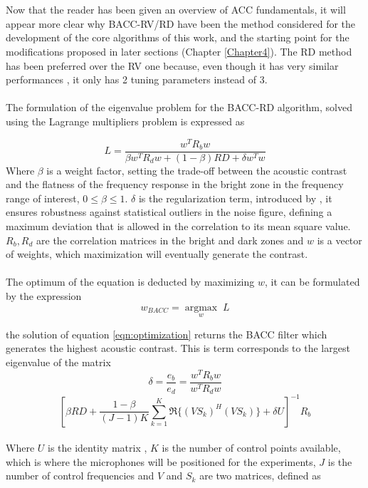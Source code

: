 \\
\\
Now that the reader has been given an overview of ACC fundamentals, it will appear more clear why BACC-RV/RD have been the method considered for the development of the core algorithms of this work, and the starting point for the modifications proposed in later sections (Chapter \ref{Chapter4}). The RD method has been preferred over the RV one because, even though it has very similar performances \parencite{cai_time-domain_2014,schellekens_time_2016}, it only has 2 tuning parameters instead of 3.
\\
\\
The formulation of the eigenvalue problem for the BACC-RD algorithm, solved using the Lagrange multipliers problem is expressed as

\begin{equation}
L = \frac{w^T R_b w}{\beta w^T R_d w + (1 - \beta) RD + \delta w^T w}
\label{eqn:lagrange}
\end{equation}
Where $\beta$ is a weight factor, setting the trade-off between the acoustic contrast and the flatness of the frequency response in the bright zone in the frequency range of interest, $0\le \beta \le 1$. $\delta$ is the regularization term, introduced by \parencite{elliott_robustness_2012}, it ensures robustness against statistical outliers in the noise figure, defining a maximum deviation that is allowed in the correlation to its mean square value. $R_b, R_d$ are the correlation matrices in the bright and dark zones and $w$ is a vector of weights, which maximization will eventually generate the contrast.
\\
\\
The optimum of the equation is deducted by maximizing $w$, it can be formulated by the expression
\\
\begin{equation}
w_{BACC} = \underset{w}{\operatorname{argmax}} \; L
\label{eqn:optimization}
\end{equation}

the solution of equation \ref{eqn:optimization} returns the BACC filter which generates the highest acoustic contrast. This is term corresponds to the largest eigenvalue of the matrix
\\
\begin{equation}
\delta=\frac{e_b}{e_d}=\frac{w^T R_b w}{w^T R_d w}
\label{eqn:contrast}
\end{equation}\[ \left[ \beta RD + \frac{1 - \beta}{(J-1) K}\sum\limits_{k=1}^{K} \Re \{ (V S_k)^H (V S_k) \} + \delta U \right]^{-1} R_b\]
\\
Where $U$ is the identity matrix \parencite{cai_time-domain_2014}, $K$ is the number of control points available, which is where the microphones will be positioned for the experiments, $J$ is the number of control frequencies and $V$ and $S_k$ are two matrices, defined as

